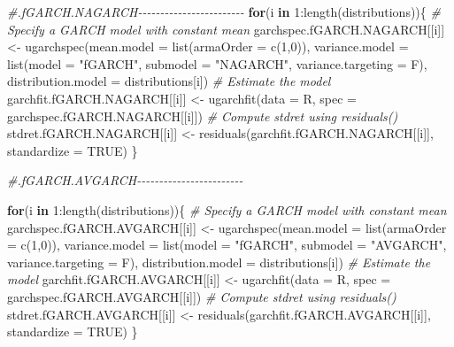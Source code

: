 \documentclass[a4paper, twoside]{templates/ociamthesis}
\newenvironment{Shaded}{\begin{snugshade}}{\end{snugshade}}
\newcommand{\AttributeTok}[1]{\textcolor[rgb]{0.77,0.63,0.00}{#1}}
\newcommand{\CommentTok}[1]{\textcolor[rgb]{0.56,0.35,0.01}{\textit{#1}}}
\newcommand{\ConstantTok}[1]{\textcolor[rgb]{0.00,0.00,0.00}{#1}}
\newcommand{\ControlFlowTok}[1]{\textcolor[rgb]{0.13,0.29,0.53}{\textbf{#1}}}
\newcommand{\DecValTok}[1]{\textcolor[rgb]{0.00,0.00,0.81}{#1}}
\newcommand{\FunctionTok}[1]{\textcolor[rgb]{0.00,0.00,0.00}{#1}}
\newcommand{\NormalTok}[1]{#1}
\newcommand{\OtherTok}[1]{\textcolor[rgb]{0.56,0.35,0.01}{#1}}
\newcommand{\SpecialCharTok}[1]{\textcolor[rgb]{0.00,0.00,0.00}{#1}}
\newcommand{\StringTok}[1]{\textcolor[rgb]{0.31,0.60,0.02}{#1}}
\renewenvironment{Shaded}
{
  \vspace{10pt}%
  \begin{snugshade}%
}{%
  \end{snugshade}%
  \vspace{8pt}%
}
\begin{document}
\begin{Shaded}
\begin{Highlighting}[]
\CommentTok{\#.fGARCH.NAGARCH{-}{-}{-}{-}{-}{-}{-}{-}{-}{-}{-}{-}{-}{-}{-}{-}{-}{-}{-}{-}{-}{-}{-}{-}}
\ControlFlowTok{for}\NormalTok{(i }\ControlFlowTok{in} \DecValTok{1}\SpecialCharTok{:}\FunctionTok{length}\NormalTok{(distributions))\{}
\CommentTok{\# Specify a GARCH model with constant mean}
\NormalTok{garchspec.fGARCH.NAGARCH[[i]] }\OtherTok{\textless{}{-}} \FunctionTok{ugarchspec}\NormalTok{(}\AttributeTok{mean.model =} \FunctionTok{list}\NormalTok{(}\AttributeTok{armaOrder =} \FunctionTok{c}\NormalTok{(}\DecValTok{1}\NormalTok{,}\DecValTok{0}\NormalTok{)),}
                     \AttributeTok{variance.model =} \FunctionTok{list}\NormalTok{(}\AttributeTok{model =} \StringTok{"fGARCH"}\NormalTok{, }\AttributeTok{submodel =} \StringTok{"NAGARCH"}\NormalTok{, }\AttributeTok{variance.targeting =}\NormalTok{ F),}
                     \AttributeTok{distribution.model =}\NormalTok{ distributions[i])}
\CommentTok{\# Estimate the model}
\NormalTok{garchfit.fGARCH.NAGARCH[[i]] }\OtherTok{\textless{}{-}} \FunctionTok{ugarchfit}\NormalTok{(}\AttributeTok{data =}\NormalTok{ R, }\AttributeTok{spec =}\NormalTok{ garchspec.fGARCH.NAGARCH[[i]])}
\CommentTok{\# Compute stdret using residuals()}
\NormalTok{stdret.fGARCH.NAGARCH[[i]] }\OtherTok{\textless{}{-}} \FunctionTok{residuals}\NormalTok{(garchfit.fGARCH.NAGARCH[[i]], }\AttributeTok{standardize =} \ConstantTok{TRUE}\NormalTok{)}
\NormalTok{\}}

\CommentTok{\#.fGARCH.AVGARCH{-}{-}{-}{-}{-}{-}{-}{-}{-}{-}{-}{-}{-}{-}{-}{-}{-}{-}{-}{-}{-}{-}{-}{-}}

\ControlFlowTok{for}\NormalTok{(i }\ControlFlowTok{in} \DecValTok{1}\SpecialCharTok{:}\FunctionTok{length}\NormalTok{(distributions))\{}
\CommentTok{\# Specify a GARCH model with constant mean}
\NormalTok{garchspec.fGARCH.AVGARCH[[i]] }\OtherTok{\textless{}{-}} \FunctionTok{ugarchspec}\NormalTok{(}\AttributeTok{mean.model =} \FunctionTok{list}\NormalTok{(}\AttributeTok{armaOrder =} \FunctionTok{c}\NormalTok{(}\DecValTok{1}\NormalTok{,}\DecValTok{0}\NormalTok{)),}
                     \AttributeTok{variance.model =} \FunctionTok{list}\NormalTok{(}\AttributeTok{model =} \StringTok{"fGARCH"}\NormalTok{, }\AttributeTok{submodel =} \StringTok{"AVGARCH"}\NormalTok{, }\AttributeTok{variance.targeting =}\NormalTok{ F),}
                     \AttributeTok{distribution.model =}\NormalTok{ distributions[i])}
\CommentTok{\# Estimate the model}
\NormalTok{garchfit.fGARCH.AVGARCH[[i]] }\OtherTok{\textless{}{-}} \FunctionTok{ugarchfit}\NormalTok{(}\AttributeTok{data =}\NormalTok{ R, }\AttributeTok{spec =}\NormalTok{ garchspec.fGARCH.AVGARCH[[i]])}
\CommentTok{\# Compute stdret using residuals()}
\NormalTok{stdret.fGARCH.AVGARCH[[i]] }\OtherTok{\textless{}{-}} \FunctionTok{residuals}\NormalTok{(garchfit.fGARCH.AVGARCH[[i]], }\AttributeTok{standardize =} \ConstantTok{TRUE}\NormalTok{)}
\NormalTok{\}}


\end{Highlighting}
\end{Shaded}
\end{document}

